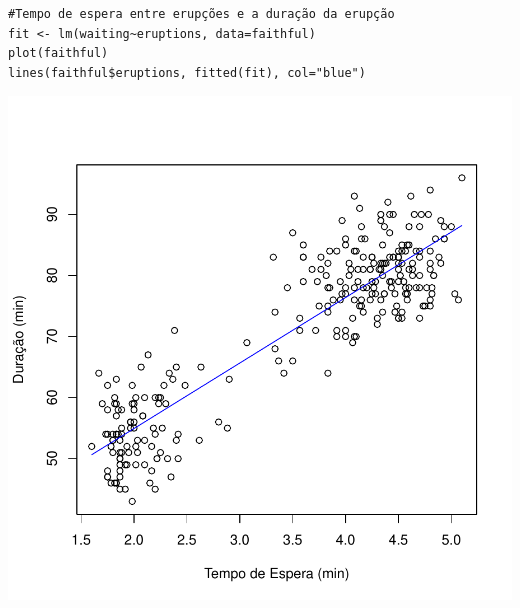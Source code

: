 \documentclass[14pt,aspectratio=1610]{beamer}
\begin{document}
\begin{frame}[fragile]{}
\frametitle{ }
\begin{block}{}
\begin{center}
\begin{verbatim}
#Tempo de espera entre erupções e a duração da erupção
fit <- lm(waiting~eruptions, data=faithful)
plot(faithful)
lines(faithful$eruptions, fitted(fit), col="blue")
\end{verbatim}
\end{center}
\end{block}
\vspace{-1.3cm}
\begin{center}
\includegraphics{Aula4Regressao/Figuras/Aula4-006}
\end{center}
\end{frame}
\end{document}

